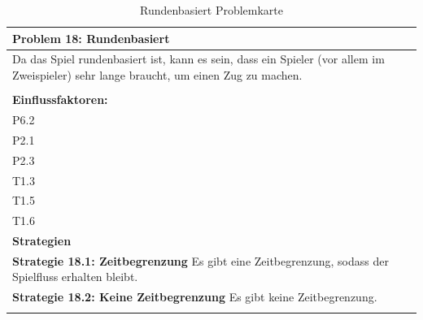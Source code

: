 \documentclass[fontsize=12pt,paper=a4,twoside]{scrartcl}
\begin{document}
\begin{table}[H]
    \centering
    \begin{tabular}{|p{15cm}|}
    \hline
          \textbf{Problem 18: Rundenbasiert}  \\ \hline
	Da das Spiel rundenbasiert ist, kann es sein, dass ein Spieler (vor allem im Zweispieler) sehr lange braucht, um einen Zug zu machen. \\
         \\ \hline
          \textbf{Einflussfaktoren: } \\
	P6.2 \\
	P2.1 \\
	P2.3 \\
	T1.3 \\
	T1.5 \\
	T1.6 \\
          \hline
          \textbf{Strategien} \\ \hline
            {}          
           \label{strategie:18.1}     
          \textbf{Strategie 18.1: Zeitbegrenzung} Es gibt eine Zeitbegrenzung, sodass der Spielfluss erhalten bleibt.   \\        
  {}          
           \label{strategie:18.2}              
          \textbf{Strategie 18.2: Keine Zeitbegrenzung} Es gibt keine Zeitbegrenzung. \\
	 \\ \hline
    \end{tabular}

    \caption{Rundenbasiert Problemkarte}
    \label{tab:ProblemKarte18}
\end{table}
\end{document}
